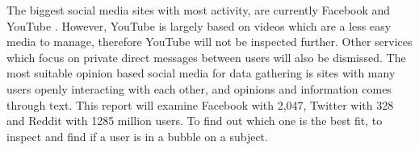 The biggest social media sites with most activity, are currently Facebook and
YouTube \citep{SocialMediaStats}.
However, YouTube is largely based on videos which are a less easy media to
manage, therefore YouTube will not be inspected further. Other services which
focus on private direct messages between users will also be dismissed. The most
suitable opinion based social media for data gathering is sites with many users
openly interacting with each other, and opinions and information comes through
text. This report will examine Facebook with 2,047, Twitter with 328 and
Reddit with 1285 million users. To find out which one is the best fit, to inspect and
find if a user is in a bubble on a subject.